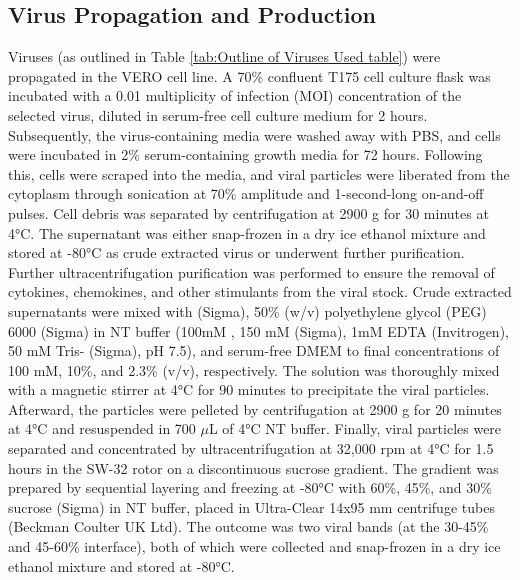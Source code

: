 \subsection{Virus Propagation and Production} \label{subsec:Virus Propagation and Production}
Viruses (as outlined in Table \ref{tab:Outline of Viruses Used table}) were propagated in the VERO cell line. A 70\% confluent T175 cell culture flask was incubated with a 0.01 multiplicity of infection (MOI) concentration of the selected virus, diluted in serum-free cell culture medium for 2 hours. Subsequently, the virus-containing media were washed away with PBS, and cells were incubated in 2\% serum-containing growth media for 72 hours. Following this, cells were scraped into the media, and viral particles were liberated from the cytoplasm through sonication at 70\% amplitude and 1-second-long on-and-off pulses. Cell debris was separated by centrifugation at 2900 g for 30 minutes at 4°C. The supernatant was either snap-frozen in a dry ice ethanol mixture and stored at -80°C as crude extracted virus or underwent further purification. Further ultracentrifugation purification was performed to ensure the removal of cytokines, chemokines, and other stimulants from the viral stock. Crude extracted supernatants were mixed with  (Sigma), 50\% (w/v) polyethylene glycol (PEG) 6000 (Sigma) in NT buffer (100mM , 150 mM  (Sigma), 1mM EDTA (Invitrogen), 50 mM Tris- (Sigma), pH 7.5), and serum-free DMEM to final concentrations of 100 mM, 10\%, and 2.3\% (v/v), respectively. The solution was thoroughly mixed with a magnetic stirrer at 4°C for 90 minutes to precipitate the viral particles. Afterward, the particles were pelleted by centrifugation at 2900 g for 20 minutes at 4°C and resuspended in 700 $\mu$L of 4°C NT buffer. Finally, viral particles were separated and concentrated by ultracentrifugation at 32,000 rpm at 4°C for 1.5 hours in the SW-32 rotor on a discontinuous sucrose gradient. The gradient was prepared by sequential layering and freezing at -80°C with 60\%, 45\%, and 30\% sucrose (Sigma) in NT buffer, placed in Ultra-Clear 14x95 mm centrifuge tubes (Beckman Coulter UK Ltd). The outcome was two viral bands (at the 30-45\% and 45-60\% interface), both of which were collected and snap-frozen in a dry ice ethanol mixture and stored at -80°C.

